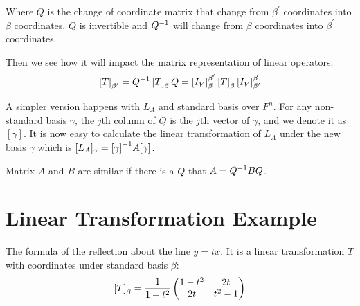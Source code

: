 Where $Q$ is the change of coordinate matrix that change from $\beta^\prime$ coordinates into $\beta$ coordinates. $Q$ is invertible and ${Q}^{-1}$ will change from $\beta$ coordinates into $\beta^\prime$ coordinates. 

Then we see how it will impact the matrix representation of linear operators:
\begin{equation}\label{change_of_coordinate_formula}
    \coordinate{T}_{\beta^\prime} = \inverse{Q} \coordinate{T}_{\beta} Q = \coordinate{I_V}_\beta^{\beta^\prime} \coordinate{T}_\beta \coordinate{I_V}_{\beta^\prime}^\beta
\end{equation}

A simpler version happens with $L_A$ and standard basis over $F^n$. For any non-standard basis $\gamma$, the $j$th column of $Q$ is the $j$th vector of $\gamma$, and we denote it as $[\gamma]$. It is now easy to calculate the linear transformation of $L_A$ under the new basis $\gamma$ which is $[L_A]_\gamma = {[\gamma]}^{-1} A [\gamma]$.


\begin{definition}[similar]
    Matrix $A$ and $B$ are similar if there is a $Q$ that $A = {Q}^{-1} B Q$.    
\end{definition}


%
%
%
%

\section{Linear Transformation Example}

\begin{example}
    The formula of the reflection about the line $y=tx$. It is a linear transformation $T$ with coordinates under standard basis $\beta$:
    \begin{equation*}
        \coordinate{T}_\beta = \frac{1}{1 + t^2} \begin{pmatrix}
            1-t^2 & 2t \\
            2t & t^2 -1
        \end{pmatrix}
    \end{equation*}
\end{example}


